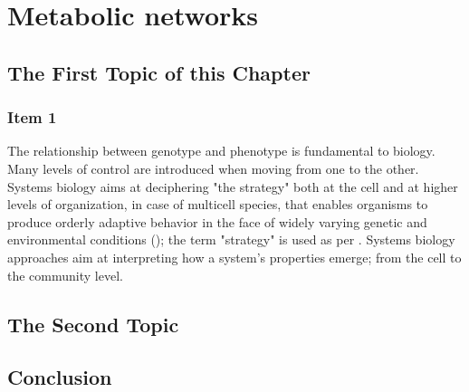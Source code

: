 \chapter{Metabolic networks}
\label{cha:4}


\section{The First Topic of this Chapter}
\subsection{Item 1}
The relationship between genotype and phenotype is fundamental to biology.
Many levels of control are introduced when moving from one to the other. 
Systems biology aims at deciphering "the strategy" both at the cell and at higher levels of organization, in case of multicell species, that enables organisms to produce orderly adaptive behavior in the face of widely varying genetic and environmental conditions (\cite{strohman2002maneuvering}); the term "strategy" is used as per \cite{polanyi1968life}.
Systems biology approaches aim at interpreting how a system's properties emerge; from the cell to the community level.



\section{The Second Topic}


\section{Conclusion}


